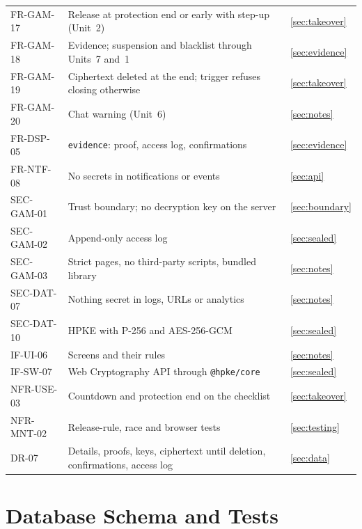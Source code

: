 \documentclass[11pt,a4paper]{article}
\begin{document}
{\begin{longtable}{@{}>{\ttfamily}p{2.4cm}>{\raggedright\arraybackslash}p{10.6cm}>{\raggedright\arraybackslash}p{2.2cm}@{}}
FR-GAM-17 & Release at protection end or early with step-up (Unit~2) & \ref{sec:takeover} \\
FR-GAM-18 & Evidence; suspension and blacklist through Units~7 and~1 & \ref{sec:evidence} \\
FR-GAM-19 & Ciphertext deleted at the end; trigger refuses closing otherwise & \ref{sec:takeover} \\
FR-GAM-20 & Chat warning (Unit~6) & \ref{sec:notes} \\
FR-DSP-05 & \texttt{evidence}: proof, access log, confirmations & \ref{sec:evidence} \\
FR-NTF-08 & No secrets in notifications or events & \ref{sec:api} \\
SEC-GAM-01 & Trust boundary; no decryption key on the server & \ref{sec:boundary} \\
SEC-GAM-02 & Append-only access log & \ref{sec:sealed} \\
SEC-GAM-03 & Strict pages, no third-party scripts, bundled library & \ref{sec:notes} \\
SEC-DAT-07 & Nothing secret in logs, URLs or analytics & \ref{sec:notes} \\
SEC-DAT-10 & HPKE with P-256 and AES-256-GCM & \ref{sec:sealed} \\
IF-UI-06 & Screens and their rules & \ref{sec:notes} \\
IF-SW-07 & Web Cryptography API through \texttt{@hpke/core} & \ref{sec:sealed} \\
NFR-USE-03 & Countdown and protection end on the checklist & \ref{sec:takeover} \\
NFR-MNT-02 & Release-rule, race and browser tests & \ref{sec:testing} \\
DR-07 & Details, proofs, keys, ciphertext until deletion, confirmations, access log & \ref{sec:data} \\
\bottomrule
\end{longtable}}

\section{Database Schema and Tests}
\label{app:ddl}
\end{document}
